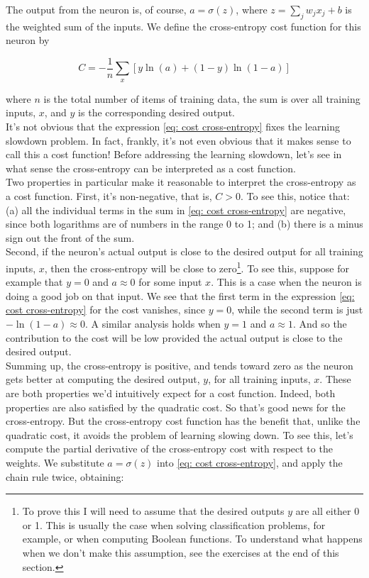 \documentclass[a4paper,11pt,twoside]{report}
\begin{document}
The output from the neuron is, of course, $a=\sigma(z)$, where $z=\sum_j w_j x_j+b$ is the weighted sum of the inputs. We define the cross-entropy cost function for this neuron by
 
\begin{equation}
C=-\frac{1}{n}\sum_x \left[y \ln(a) +(1-y)\ln (1-a)\right]
\label{eq: cost cross-entropy}
\end{equation}

where $n$ is the total number of items of training data, the sum is over all training inputs, $x$, and $y$ is the corresponding desired output.\\

It's not obvious that the expression \ref{eq: cost cross-entropy} fixes the learning slowdown problem. In fact, frankly, it's not even obvious that it makes sense to call this a cost function! Before addressing the learning slowdown, let's see in what sense the cross-entropy can be interpreted as a cost function.\\

Two properties in particular make it reasonable to interpret the cross-entropy as a cost function. First, it's non-negative, that is, $C>0$. To see this, notice that: (a) all the individual terms in the sum in \ref{eq: cost cross-entropy} are negative, since both logarithms are of numbers in the range 0 to 1; and (b) there is a minus sign out the front of the sum.\\

Second, if the neuron's actual output is close to the desired output for all training inputs, $x$, then the cross-entropy will be close to zero\footnote{To prove this I will need to assume that the desired outputs $y$ are all either 0 or 1. This is usually the case when solving classification problems, for example, or when computing Boolean functions. To understand what happens when we don't make this assumption, see the exercises at the end of this section.}. To see this, suppose for example that $y=0$ and $a\approx0$ for some input $x$. This is a case when the neuron is doing a good job on that input. We see that the first term in the expression \ref{eq: cost cross-entropy} for the cost vanishes, since $y=0$, while the second term is just $-\ln(1-a)\approx0$. A similar analysis holds when $y=1$ and $a\approx1$. And so the contribution to the cost will be low provided the actual output is close to the desired output.\\

Summing up, the cross-entropy is positive, and tends toward zero as the neuron gets better at computing the desired output, $y$, for all training inputs, $x$. These are both properties we'd intuitively expect for a cost function. Indeed, both properties are also satisfied by the quadratic cost. So that's good news for the cross-entropy. But the cross-entropy cost function has the benefit that, unlike the quadratic cost, it avoids the problem of learning slowing down. To see this, let's compute the partial derivative of the cross-entropy cost with respect to the weights. We substitute $a=\sigma(z)$ into \ref{eq: cost cross-entropy}, and apply the chain rule twice, obtaining:
\end{document}
